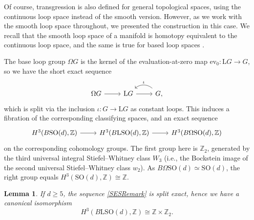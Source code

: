 \documentclass[11pt]{article}
\numberwithin{equation}{section}
\numberwithin{equation}{section}
\newtheorem{Lemma}[Theorem]{Lemma}
\newcommand{\Z}{\mathbb{Z}}
\newcommand{\SO}{\mathrm{SO}}
\renewcommand{\L}{\mathrm{L}}
\begin{document}
\begin{Remark}
Of course, transgression is also defined for general topological spaces, using the continuous loop space instead of the smooth version.
However, as we work with the smooth loop space throughout, we presented the construction in this case.
We recall that the smooth loop space of a manifold is homotopy equivalent to the continuous loop space, and the same is true for based loop spaces \cite[Proposition~7.1]{CareyCrowleyMurray}.
\end{Remark}



The base loop group $\Omega G$ is the kernel of the evaluation-at-zero map $\mathrm{ev}_0\colon \L G \to G$, so we have the short exact sequence
\begin{equation} \label{PathSequence}
 \begin{tikzcd}
 \Omega G \ar[r] & \L G \ar[r] & G \ar[l, bend right=40, "\iota"'],
\end{tikzcd}
\end{equation}
which is split via the inclusion $\iota\colon G \to \L G$ as constant loops.
This induces a fibration of the corresponding classifying spaces, and an exact sequence
\begin{equation} \label{SESRemark}
\begin{tikzcd}
H^3(B\SO(d), \Z) \ar[r] & H^3(B\L\SO(d), \Z) \ar[r] & H^3(B\Omega\SO(d), \Z)
\end{tikzcd}
\end{equation}
on the corresponding cohomology groups.
The first group here is $\Z_2$, generated by the third universal integral Stiefel--Whitney class $W_3$ (i.e., the Bockstein image of the second universal Stiefel--Whitney class $w_2$).
As $B\Omega\SO(d) \simeq \SO(d)$, the right group equals $H^3(\SO(d), \Z) \cong \Z$.

\begin{Lemma} \label{LemmaH3BLSOZ}
If $d \geq 5$, the sequence \eqref{SESRemark} is split exact, hence we have a canonical isomorphism
\begin{equation*}
 H^3(B\L\SO(d), \Z) \cong \Z \times \Z_2.
\end{equation*}
\end{Lemma}
\end{document}
